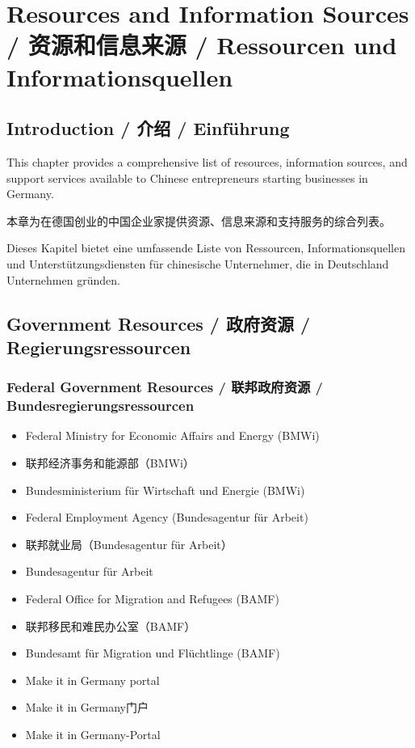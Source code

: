 \chapter{Resources and Information Sources / 资源和信息来源 / Ressourcen und Informationsquellen}

\section{Introduction / 介绍 / Einführung}

This chapter provides a comprehensive list of resources, information sources, and support services available to Chinese entrepreneurs starting businesses in Germany.

本章为在德国创业的中国企业家提供资源、信息来源和支持服务的综合列表。

Dieses Kapitel bietet eine umfassende Liste von Ressourcen, Informationsquellen und Unterstützungsdiensten für chinesische Unternehmer, die in Deutschland Unternehmen gründen.

\section{Government Resources / 政府资源 / Regierungsressourcen}

\subsection{Federal Government Resources / 联邦政府资源 / Bundesregierungsressourcen}
\begin{itemize}
    \item Federal Ministry for Economic Affairs and Energy (BMWi)
    \item 联邦经济事务和能源部（BMWi）
    \item Bundesministerium für Wirtschaft und Energie (BMWi)
    \item Federal Employment Agency (Bundesagentur für Arbeit)
    \item 联邦就业局（Bundesagentur für Arbeit）
    \item Bundesagentur für Arbeit
    \item Federal Office for Migration and Refugees (BAMF)
    \item 联邦移民和难民办公室（BAMF）
    \item Bundesamt für Migration und Flüchtlinge (BAMF)
    \item Make it in Germany portal
    \item Make it in Germany门户
    \item Make it in Germany-Portal
\end{itemize}

